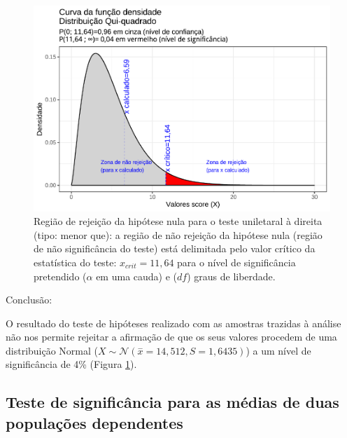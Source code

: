 \documentclass[
]{book}
\begin{document}
\begin{figure}

{\centering \includegraphics[width=1\linewidth]{apostila_files/figure-latex/fig98-1} 

}

\caption{Região de rejeição da hipótese nula para o teste uniletaral à direita (tipo: menor que): a região de não rejeição da hipótese nula (região de não significância do teste) está delimitada pelo valor crítico da estatística do teste: $x_{crit}=11,64$ para o nível de significância pretendido ($\alpha$ em uma cauda)  e ($df$) graus de liberdade.}\label{fig:fig98}
\end{figure}

\hfill\break

Conclusão:

\hfill\break

O resultado do teste de hipóteses realizado com as amostras trazidas à análise não nos permite rejeitar a afirmação de que os seus valores procedem de uma distribuição Normal (\(X \sim \mathcal{N}(\stackrel{-}{x}=14,512, S=1,6435)\)) a um nível de significância de 4\% (Figura \ref{fig:fig98}).

\hfill\break

\hypertarget{teste-de-significuxe2ncia-para-as-muxe9dias-de-duas-populauxe7uxf5es-dependentes}{%
\subsection{Teste de significância para as médias de duas populações dependentes}\label{teste-de-significuxe2ncia-para-as-muxe9dias-de-duas-populauxe7uxf5es-dependentes}}
\end{document}
